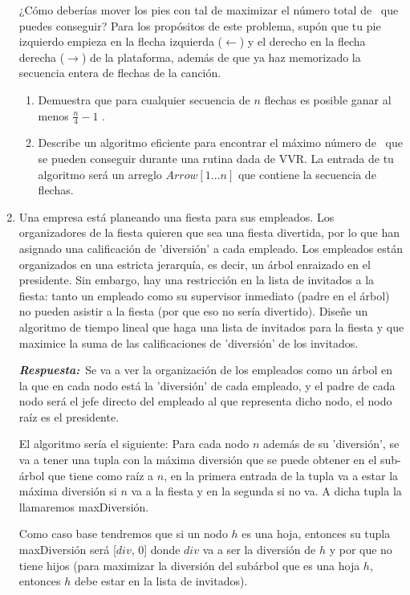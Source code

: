 \documentclass[11pt,letterpaper]{article}
\newcommand\respuesta{\textbf{\textit{Respuesta:}}}
\begin{document}
\begin{enumerate}[leftmargin=*]
    ¿Cómo deberías mover los pies con tal de maximizar el número total de \stylePoints\ que puedes conseguir? Para los propósitos de este problema, supón que tu pie izquierdo empieza en la flecha izquierda ($\leftarrow$) y el derecho en la flecha derecha ($\rightarrow$) de la plataforma, además de que ya haz memorizado la secuencia entera de flechas de la canción.
    
    \begin{enumerate}[label=\alph*)]
        \item Demuestra que para cualquier secuencia de $n$ flechas es posible ganar al menos $\frac{n}{4} - 1$ \stylePoints .
        
        \item Describe un algoritmo eficiente para encontrar el máximo número de \stylePoints\ que se pueden conseguir durante una rutina dada de VVR. La entrada de tu algoritmo será un arreglo $Arrow[1...n]$ que contiene la secuencia de flechas.
    \end{enumerate}
    
    \item Una empresa está planeando una fiesta para sus empleados. Los organizadores de la fiesta quieren que sea una fiesta divertida, por lo que han asignado una calificación de 'diversión' a cada empleado. Los empleados están organizados en una estricta jerarquía, es decir, un árbol enraizado en el presidente. Sin embargo, hay una restricción en la lista de invitados a la fiesta: tanto un empleado como su supervisor inmediato (padre en el árbol) no pueden asistir a la fiesta (por que eso no sería divertido). Diseñe un algoritmo de tiempo lineal que haga una lista de invitados para la fiesta y que maximice la suma de las calificaciones de 'diversión' de los invitados.
    
    \respuesta\ Se va a ver la organización de los empleados como un árbol en la que en cada nodo está la 'diversión' de cada empleado, y el padre de cada nodo será el jefe directo del empleado al que representa dicho nodo, el nodo raíz es el presidente.
    
    El algoritmo sería el siguiente: Para cada nodo $n$ además de su 'diversión', se va a tener una tupla con la máxima diversión que se puede obtener en el sub-árbol que tiene como raíz a $n$, en la primera entrada de la tupla va a estar la máxima diversión si $n$ va a la fiesta y en la segunda si no va. A dicha tupla la llamaremos maxDiversión.

    Como caso base tendremos que si un nodo $h$ es una hoja, entonces su tupla maxDiversión será [$div$, 0] donde $div$ va a ser la diversión de $h$ y por que no tiene hijos (para maximizar la diversión del subárbol que es una hoja $h$, entonces $h$ debe estar en la lista de invitados).


\end{enumerate}
\end{document}
